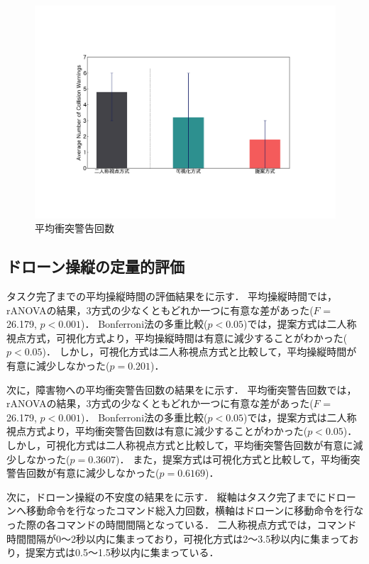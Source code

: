 \documentclass[a4paper,11pt]{ujreport}
\begin{document}
\begin{figure}[!tb]
  \centering
  \includegraphics[width=0.7\linewidth]{img/05_collision.pdf}
  \caption{平均衝突警告回数}
  \label{fig:05_collision}
\end{figure}


\subsection{ドローン操縦の定量的評価}
\label{sec:QuantitativePerformance}

タスク完了までの平均操縦時間の評価結果をに示す．
平均操縦時間では，rANOVAの結果，3方式の少なくともどれか一つに有意な差があった($F$ = 26.179, $p < 0.001 $)．
Bonferroni法の多重比較($p < 0.05$)では，提案方式は二人称視点方式，可視化方式より，平均操縦時間は有意に減少することがわかった($p < 0.05$)．
しかし，可視化方式は二人称視点方式と比較して，平均操縦時間が有意に減少しなかった($p = 0.201$)．
\par
次に，障害物への平均衝突警告回数の結果をに示す．
平均衝突警告回数では，rANOVAの結果，3方式の少なくともどれか一つに有意な差があった($F$ = 26.179, $p < 0.001 $)．
Bonferroni法の多重比較($p < 0.05$)では，提案方式は二人称視点方式より，平均衝突警告回数は有意に減少することがわかった($p < 0.05$)．
しかし，可視化方式は二人称視点方式と比較して，平均衝突警告回数が有意に減少しなかった($p = 0.3607$)．
また，提案方式は可視化方式と比較して，平均衝突警告回数が有意に減少しなかった($p = 0.6169$)．
\par
次に，ドローン操縦の不安度の結果をに示す．
縦軸はタスク完了までにドローンへ移動命令を行なったコマンド総入力回数，横軸はドローンに移動命令を行なった際の各コマンドの時間間隔となっている．
二人称視点方式では，コマンド時間間隔が0〜2秒以内に集まっており，可視化方式は2〜3.5秒以内に集まっており，提案方式は0.5〜1.5秒以内に集まっている．
\end{document}
